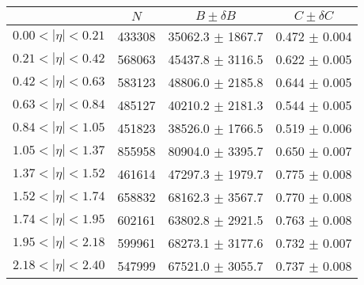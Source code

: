 \begin{tabular}{lccc}
\hline
    &   $N$   & $B \pm \delta B$  &  $C \pm \delta C$ \\
\hline
$0.00 < |\eta| <0.21$          & 433308     & 35062.3    $\pm$ 1867.7 & 0.472      $\pm$ 0.004 \\
$0.21 < |\eta| <0.42$          & 568063     & 45437.8    $\pm$ 3116.5 & 0.622      $\pm$ 0.005 \\
$0.42 < |\eta| <0.63$          & 583123     & 48806.0    $\pm$ 2185.8 & 0.644      $\pm$ 0.005 \\
$0.63 < |\eta| <0.84$          & 485127     & 40210.2    $\pm$ 2181.3 & 0.544      $\pm$ 0.005 \\
$0.84 < |\eta| <1.05$          & 451823     & 38526.0    $\pm$ 1766.5 & 0.519      $\pm$ 0.006 \\
$1.05 < |\eta| <1.37$          & 855958     & 80904.0    $\pm$ 3395.7 & 0.650      $\pm$ 0.007 \\
$1.37 < |\eta| <1.52$          & 461614     & 47297.3    $\pm$ 1979.7 & 0.775      $\pm$ 0.008 \\
$1.52 < |\eta| <1.74$          & 658832     & 68162.3    $\pm$ 3567.7 & 0.770      $\pm$ 0.008 \\
$1.74 < |\eta| <1.95$          & 602161     & 63802.8    $\pm$ 2921.5 & 0.763      $\pm$ 0.008 \\
$1.95 < |\eta| <2.18$          & 599961     & 68273.1    $\pm$ 3177.6 & 0.732      $\pm$ 0.007 \\
$2.18 < |\eta| <2.40$          & 547999     & 67521.0    $\pm$ 3055.7 & 0.737      $\pm$ 0.008 \\
\hline
\end{tabular}
